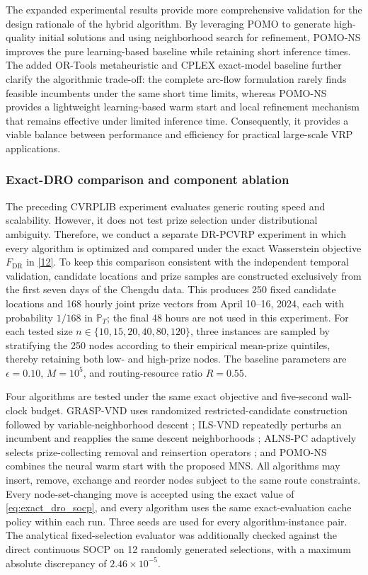 \documentclass[preprint,12pt,authoryear]{elsarticle}
\theoremstyle{definition}
\begin{document}
The expanded experimental results provide more comprehensive validation for the design rationale of the hybrid algorithm. By leveraging POMO to generate high-quality initial solutions and using neighborhood search for refinement, POMO-NS improves the pure learning-based baseline while retaining short inference times. The added OR-Tools metaheuristic and CPLEX exact-model baseline further clarify the algorithmic trade-off: the complete arc-flow formulation rarely finds feasible incumbents under the same short time limits, whereas POMO-NS provides a lightweight learning-based warm start and local refinement mechanism that remains effective under limited inference time. Consequently, it provides a viable balance between performance and efficiency for practical large-scale VRP applications.

{
\subsubsection{Exact-DRO comparison and component ablation}
\label{sec:exact_dro_benchmark}

The preceding CVRPLIB experiment evaluates generic routing speed and scalability. 
However,  it does not test prize selection under distributional ambiguity. Therefore, we conduct a separate DR-PCVRP experiment in which every algorithm is optimized and compared under the exact Wasserstein objective $F_{\mathrm{DR}}$ in \eqref{12}. To keep this comparison consistent with the independent temporal validation, candidate locations and prize samples are constructed exclusively from the first seven days of the Chengdu data. This produces 250 fixed candidate locations and 168 hourly joint prize vectors from April 10--16, 2024, each with probability $1/168$ in $\mathbb{P}_T$; the final 48 hours are not used in this experiment. For each tested size $n\in\{10,15,20,40,80,120\}$, three instances are sampled by stratifying the 250 nodes according to their empirical mean-prize quintiles, thereby retaining both low- and high-prize nodes. The baseline parameters are $\epsilon=0.10$, $M=10^5$, and routing-resource ratio $R=0.55$.

Four algorithms are tested under the same exact objective and five-second wall-clock budget. GRASP-VND uses randomized restricted-candidate construction followed by variable-neighborhood descent \citep{feo1995grasp}; ILS-VND repeatedly perturbs an incumbent and reapplies the same descent neighborhoods \citep{lourenco2010ils}; ALNS-PC adaptively selects prize-collecting removal and reinsertion operators \citep{ropke2006alns}; and POMO-NS combines the neural warm start with the proposed MNS. All algorithms may insert, remove, exchange and reorder nodes subject to the same route constraints. Every node-set-changing move is accepted using the exact value of \eqref{eq:exact_dro_socp}, and every algorithm uses the same exact-evaluation cache policy within each run. Three seeds are used for every algorithm-instance pair. The analytical fixed-selection evaluator was additionally checked against the direct continuous SOCP on 12 randomly generated selections, with a maximum absolute discrepancy of $2.46\times10^{-5}$.

}
\end{document}
